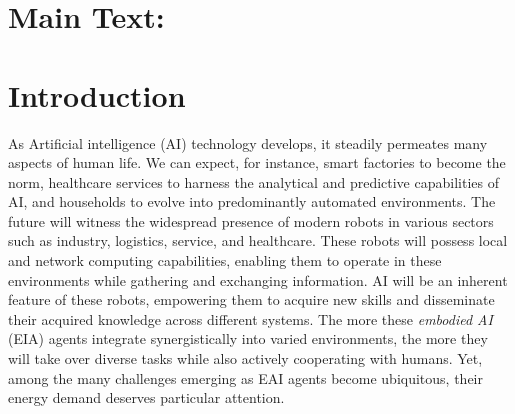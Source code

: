 \documentclass[12pt]{article}
\renewcommand{\emph}[1]{\textit{#1}}
\begin{document}

\newcommand{\beginsupplement}
{%
	\setcounter{table}{0}
	\renewcommand{\thesection}{S\arabic{section}}
	\renewcommand{\thetable}{S\arabic{table}}%
	\setcounter{figure}{0}
	\renewcommand{\thefigure}{S\arabic{figure}}%
}


\section*{Main Text:}

\section*{Introduction}\label{sec:intro}
As Artificial intelligence (AI) technology develops, it steadily permeates many aspects of human life. We can expect, for instance, smart factories to become the norm, healthcare services to harness the analytical and predictive capabilities of AI, and households to evolve into predominantly automated environments. The future will witness the widespread presence of modern robots in various sectors such as industry, logistics, service, and healthcare. These robots will possess local and network computing capabilities, enabling them to operate in these environments while gathering and exchanging information. AI will be an inherent feature of these robots, empowering them to acquire new skills and disseminate their acquired knowledge across different systems. The more these \emph{embodied AI} (EIA) agents integrate synergistically into varied environments, the more they will take over diverse tasks while also actively cooperating with humans. Yet, among the many challenges emerging as EAI agents become ubiquitous, their energy demand deserves particular attention.
\end{document}

